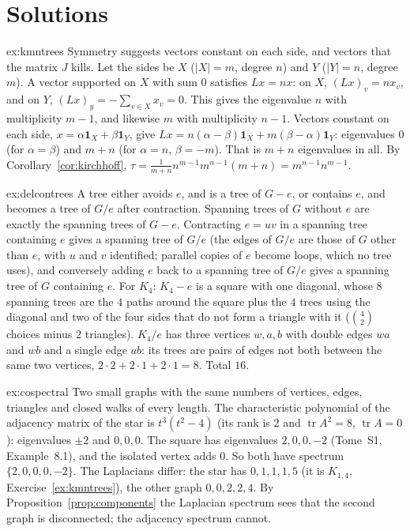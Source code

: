 \section{Solutions}

\begin{solution}{ex:kmntrees}
\idea Symmetry suggests vectors constant on each side, and vectors that the matrix $J$ kills.
\writeup Let the sides be $X$ ($|X|=m$, degree $n$) and $Y$ ($|Y|=n$, degree $m$). A vector supported on $X$ with sum $0$ satisfies $Lx=nx$: on $X$, $(Lx)_v=nx_v$, and on $Y$, $(Lx)_y=-\sum_{v\in X}x_v=0$. This gives
the eigenvalue $n$ with multiplicity $m-1$, and likewise $m$ with multiplicity $n-1$. Vectors constant on each side, $x=\alpha\mathbf1_X+\beta\mathbf1_Y$, give $Lx=n(\alpha-\beta)\mathbf1_X+m(\beta-\alpha)\mathbf1_Y$: eigenvalues
$0$ (for $\alpha=\beta$) and $m+n$ (for $\alpha=n$, $\beta=-m$). That is $m+n$ eigenvalues in all. By Corollary~\ref{cor:kirchhoff}, $\tau=\frac1{m+n}n^{m-1}m^{n-1}(m+n)=m^{n-1}n^{m-1}$.
\end{solution}

\begin{solution}{ex:delcontrees}
\idea A tree either avoids $e$, and is a tree of $G-e$, or contains $e$, and becomes a tree of $G/e$ after contraction.
\writeup Spanning trees of $G$ without $e$ are exactly the spanning trees of $G-e$. Contracting $e=uv$ in a spanning tree containing $e$ gives a spanning tree of $G/e$ (the edges of $G/e$ are those of $G$
other than $e$, with $u$ and $v$ identified; parallel copies of $e$ become loops, which no tree uses), and conversely adding $e$ back to a spanning tree of $G/e$ gives a spanning tree of $G$ containing $e$.
For $K_4$: $K_4-e$ is a square with one diagonal, whose $8$ spanning trees are the $4$ paths around the square plus the $4$ trees using the diagonal and two of the four sides that do not form a
triangle with it ($\binom42$ choices minus $2$ triangles). $K_4/e$ has three vertices $w,a,b$ with double edges $wa$ and $wb$ and a single edge $ab$: its trees are pairs of edges not both between the same
two vertices, $2\cdot2+2\cdot1+2\cdot1=8$. Total $16$.
\end{solution}

\begin{solution}{ex:cospectral}
\idea Two small graphs with the same numbers of vertices, edges, triangles and closed walks of every length.
\writeup The characteristic polynomial of the adjacency matrix of the star is $t^3(t^2-4)$ (its rank is $2$ and $\operatorname{tr}A^2=8$, $\operatorname{tr}A=0$): eigenvalues $\pm2$ and $0,0,0$. The square has eigenvalues $2,0,0,-2$ (Tome~S1, Example~8.1), and the isolated vertex
adds $0$. So both have spectrum $\{2,0,0,0,-2\}$. The Laplacians differ: the star has $0,1,1,1,5$ (it is $K_{1,4}$, Exercise~\ref{ex:kmntrees}), the other graph $0,0,2,2,4$. By Proposition~\ref{prop:components} the
Laplacian spectrum sees that the second graph is disconnected; the adjacency spectrum cannot.
\end{solution}

